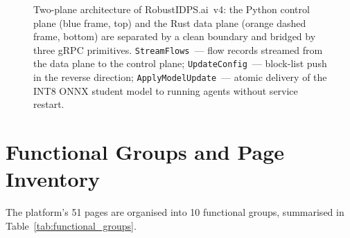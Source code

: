 \begin{figure}[htbp]
\caption{Two-plane architecture of \textsf{RobustIDPS.ai}~v4: the
Python control plane (blue frame, top) and the Rust data plane
(orange dashed frame, bottom) are separated by a clean boundary and
bridged by three gRPC primitives. \texttt{StreamFlows}~--- flow
records streamed from the data plane to the control plane;
\texttt{UpdateConfig}~--- block-list push in the reverse direction;
\texttt{ApplyModelUpdate}~--- atomic delivery of the INT8 ONNX
student model to running agents without service restart.}
\label{fig:two_plane_arch}
\end{figure}


\section{Functional Groups and Page Inventory}
\label{sec:functional_groups}

The platform's 51 pages are organised into 10 functional groups, summarised in Table~\ref{tab:functional_groups}.

